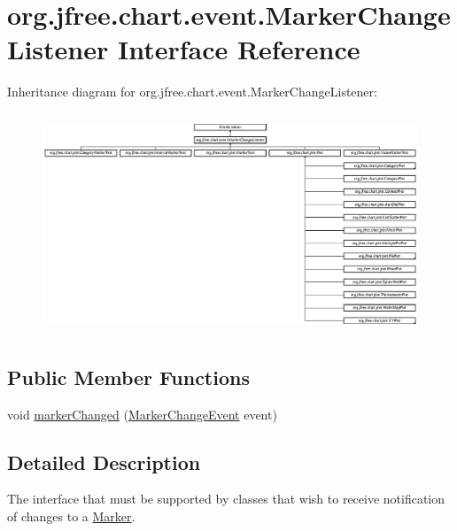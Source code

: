 \hypertarget{interfaceorg_1_1jfree_1_1chart_1_1event_1_1_marker_change_listener}{}\section{org.\+jfree.\+chart.\+event.\+Marker\+Change\+Listener Interface Reference}
\label{interfaceorg_1_1jfree_1_1chart_1_1event_1_1_marker_change_listener}
Inheritance diagram for org.\+jfree.\+chart.\+event.\+Marker\+Change\+Listener\+:\begin{figure}[H]
\begin{center}
\leavevmode
\includegraphics[height=6.612546cm]{interfaceorg_1_1jfree_1_1chart_1_1event_1_1_marker_change_listener}
\end{center}
\end{figure}
\subsection*{Public Member Functions}
\begin{DoxyCompactItemize}
\item 
void \mbox{\hyperlink{interfaceorg_1_1jfree_1_1chart_1_1event_1_1_marker_change_listener_a0797552ac12ca77a9ddd96cfe5abb60e}{marker\+Changed}} (\mbox{\hyperlink{classorg_1_1jfree_1_1chart_1_1event_1_1_marker_change_event}{Marker\+Change\+Event}} event)
\end{DoxyCompactItemize}


\subsection{Detailed Description}
The interface that must be supported by classes that wish to receive notification of changes to a \mbox{\hyperlink{}{Marker}}.

